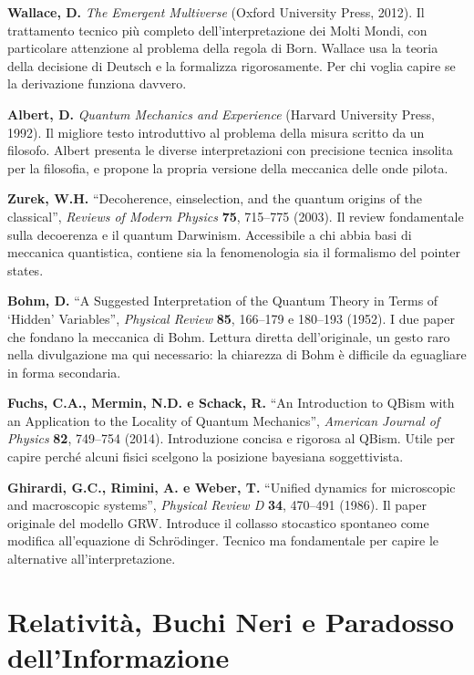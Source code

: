\documentclass[11.5pt,a4paper,openany]{book}
\theoremstyle{remark}
\begin{document}
\textbf{Wallace, D.} \textit{The Emergent Multiverse} (Oxford University Press, 2012). Il trattamento tecnico più completo dell'interpretazione dei Molti Mondi, con particolare attenzione al problema della regola di Born. Wallace usa la teoria della decisione di Deutsch e la formalizza rigorosamente. Per chi voglia capire se la derivazione funziona davvero.

\textbf{Albert, D.} \textit{Quantum Mechanics and Experience} (Harvard University Press, 1992). Il migliore testo introduttivo al problema della misura scritto da un filosofo. Albert presenta le diverse interpretazioni con precisione tecnica insolita per la filosofia, e propone la propria versione della meccanica delle onde pilota.

\textbf{Zurek, W.H.} ``Decoherence, einselection, and the quantum origins of the classical'', \textit{Reviews of Modern Physics} \textbf{75}, 715--775 (2003). Il review fondamentale sulla decoerenza e il quantum Darwinism. Accessibile a chi abbia basi di meccanica quantistica, contiene sia la fenomenologia sia il formalismo del pointer states.

\textbf{Bohm, D.} ``A Suggested Interpretation of the Quantum Theory in Terms of `Hidden' Variables'', \textit{Physical Review} \textbf{85}, 166--179 e 180--193 (1952). I due paper che fondano la meccanica di Bohm. Lettura diretta dell'originale, un gesto raro nella divulgazione ma qui necessario: la chiarezza di Bohm è difficile da eguagliare in forma secondaria.

\textbf{Fuchs, C.A., Mermin, N.D. e Schack, R.} ``An Introduction to QBism with an Application to the Locality of Quantum Mechanics'', \textit{American Journal of Physics} \textbf{82}, 749--754 (2014). Introduzione concisa e rigorosa al QBism. Utile per capire perché alcuni fisici scelgono la posizione bayesiana soggettivista.

\textbf{Ghirardi, G.C., Rimini, A. e Weber, T.} ``Unified dynamics for microscopic and macroscopic systems'', \textit{Physical Review D} \textbf{34}, 470--491 (1986). Il paper originale del modello GRW. Introduce il collasso stocastico spontaneo come modifica all'equazione di Schrödinger. Tecnico ma fondamentale per capire le alternative all'interpretazione.

\section{Relatività, Buchi Neri e Paradosso dell'Informazione}
\end{document}
